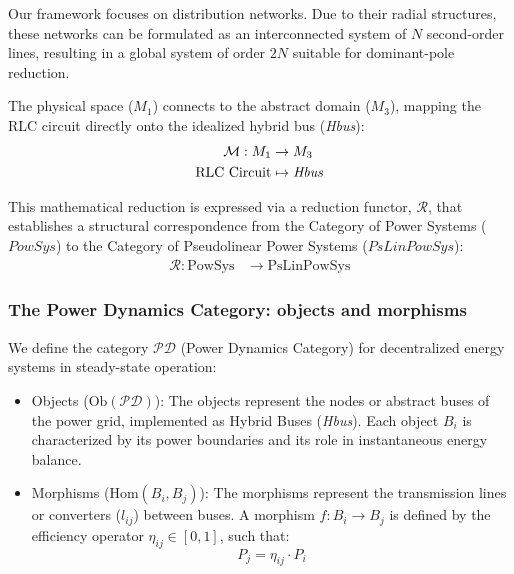 \documentclass[11pt, a4paper]{article}
\begin{document}
Our framework focuses on distribution networks. Due to their radial structures, these networks can be formulated as an interconnected system of $N$ second-order lines, resulting in a global system of order $2N$ suitable for dominant-pole reduction.

The physical space ($M_1$) connects to the abstract domain ($M_3$), mapping the RLC circuit directly onto the idealized hybrid bus (\textit{Hbus}):
\begin{equation*}
\begin{aligned}
\mathcal{M} : M_1 &\to M_3 \\
\text{RLC Circuit} &\mapsto \text{\textit{Hbus}}
\end{aligned}
\end{equation*}

This mathematical reduction is expressed via a reduction functor, $\mathcal{R}$, that establishes a structural correspondence from the Category of Power Systems (${PowSys}$) to the Category of Pseudolinear Power Systems ($PsLinPowSys$):
\begin{equation*}
\begin{aligned}
\mathcal{R} : \mathrm{PowSys} &\to \mathrm{PsLinPowSys}
\end{aligned}
\end{equation*}



\subsubsection{The Power Dynamics Category: objects and morphisms}
We define the category $\mathcal{PD}$ (Power Dynamics Category) for decentralized energy systems in steady-state operation:
\begin{itemize}
    \item {Objects ($\mathrm{Ob}(\mathcal{PD})$):} The objects represent the nodes or abstract buses of the power grid, implemented as Hybrid Buses (\textit{Hbus}). Each object $B_i$ is characterized by its power boundaries and its role in instantaneous energy balance.
    \item {Morphisms ($\mathrm{Hom}(B_i, B_j)$):} The morphisms represent the transmission lines or converters ($l_{ij}$) between buses. A morphism $f: B_i \to B_j$ is defined by the efficiency operator $\eta_{ij} \in [0, 1]$, such that:
    \begin{equation}
        P_j = \eta_{ij} \cdot P_i
    \end{equation}
\end{itemize}
\end{document}
